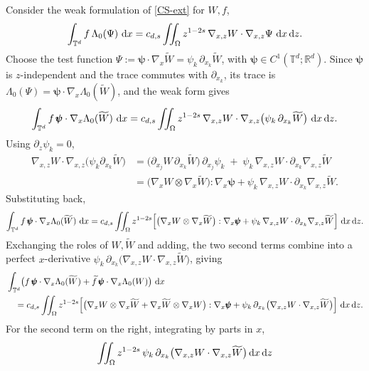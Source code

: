 \documentclass[12pt,a4paper,twoside]{article}
\newcommand{\dx}{{\,\rm d} {x}}
\numberwithin{equation}{section}%
\newcommand{\dz}{{\rm d} z}
\newcommand{\Gradx}{\nabla_x}
\newcommand{\Gradxz}{\nabla_{x,z}}
\newcommand{\Lambdaz}{\Lambda_0}
\begin{document}
\begin{pf}
	Consider the weak formulation of \eqref{CS-ext} for $W,f$,
	\[ \int_{\mathbb T^d} f\,\Lambdaz(\Psi)\,\dx
	= c_{d,s}\iint_\Omega z^{1-2s}\,\Gradxz W\cdot\Gradxz \Psi \,\dx\,\dz .\]
	Choose the test function $\Psi := \pmb\psi\cdot\Gradx\widetilde W = \psi_k\,\partial_{x_k}\widetilde W$,
	with $\pmb\psi\in C^1(\mathbb T^d;\mathbb R^d)$. Since $\pmb\psi$ is $z$-independent and the trace
	commutes with $\partial_{x_k}$, its trace is $\Lambdaz(\Psi)=\pmb\psi\cdot\Gradx\Lambdaz(\widetilde W)$,
	and the weak form gives
	\[
	\int_{\mathbb T^d} f\,\pmb\psi\cdot\Gradx\Lambdaz(\widetilde W)\,\dx
	= c_{d,s}\iint_\Omega z^{1-2s}\,\Gradxz W\cdot\Gradxz\big(\psi_k\,\partial_{x_k}\widetilde W\big)\,\dx\,\dz .
	\]
	Using $\partial_z\psi_k = 0$,
	\begin{align*}
		\Gradxz W\cdot\Gradxz\big(\psi_k \partial_{x_k}\widetilde{W}\big)
		&= \big(\partial_{x_j}W\,\partial_{x_k}\widetilde{W}\big)\,\partial_{x_j}\psi_k
		\;+\; \psi_k\,\Gradxz W\cdot \partial_{x_k}\Gradxz \widetilde{W} \\
		&= \big(\Gradx W\otimes \Gradx \widetilde{W}\big) : \Gradx\pmb\psi + \psi_k\,\Gradxz W\cdot\partial_{x_k}\Gradxz \widetilde{W}.
	\end{align*}
	Substituting back,
	\begin{equation*}
		\int_{\mathbb T^d} f\,\pmb\psi\cdot\Gradx\Lambdaz(\widetilde{W}) \,\dx 
		= c_{d,s}\iint_\Omega z^{1-2s}\Big[ \big(\Gradx W\otimes\Gradx\widetilde{W}\big):\Gradx\pmb\psi
		+ \psi_k\,\Gradxz W\cdot\partial_{x_k}\Gradxz\widetilde{W} \Big] \,\dx\,\dz .
	\end{equation*}
	Exchanging the roles of $W,\widetilde{W}$ and adding, the two second terms combine into a perfect
	$x$-derivative $\psi_k\,\partial_{x_k}\big(\Gradxz W\cdot\Gradxz\widetilde W\big)$, giving
	\begin{align}
		&\int_{\mathbb T^d}\!\big( f\,\pmb\psi\cdot\Gradx\Lambdaz(\widetilde W) + \widetilde f\,\pmb\psi\cdot\Gradx\Lambdaz(W)\big)\,\dx \nonumber\\
		&\quad= c_{d,s}\iint_\Omega z^{1-2s}\Big[ \big(\Gradx W\otimes\Gradx\widetilde W + \Gradx\widetilde W\otimes\Gradx W\big):\Gradx\pmb\psi
		+ \psi_k\,\partial_{x_k}\big(\Gradxz W\cdot\Gradxz\widetilde W\big)\Big] \,\dx\,\dz. \nonumber
	\end{align}
	For the second term on the right, integrating by parts in $x$,
	\begin{align*}
	\iint_\Omega z^{1-2s}\,\psi_k\,\partial_{x_k}\big(\Gradxz W\cdot\Gradxz\widetilde W\big) \dx \, \dz

\end{align*}
\end{pf}
\end{document}
